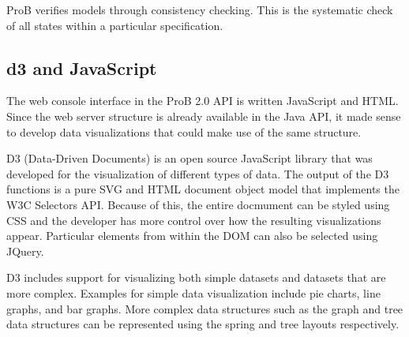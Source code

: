 ProB verifies models through consistency checking. This is the systematic check of all states within a particular specification.

\subsection{d3 and JavaScript}

The web console interface in the ProB 2.0 API is written JavaScript and HTML. Since the web server structure is already available in the Java API, it made sense to develop data visualizations that could make use of the same structure. 

D3 (Data-Driven Documents) is an open source JavaScript library that was developed for the visualization of different types of data. The output of the D3 functions is a pure SVG and HTML document object model that implements the W3C Selectors API. Because of this, the entire docmument can be styled using CSS and the developer has more control over how the resulting visualizations appear. Particular elements from within the DOM can also be selected using JQuery. 

D3 includes support for visualizing both simple datasets and datasets that are more complex. Examples for simple data visualization include pie charts, line graphs, and bar graphs. More complex data structures such as the graph and tree data structures can be represented using the spring and tree layouts respectively.
